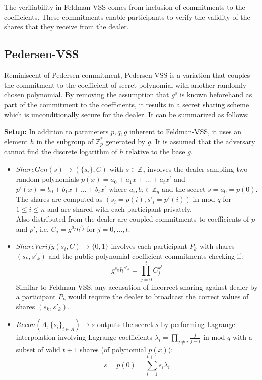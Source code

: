 \documentclass[letterpaper,twocolumn,10pt]{article}
\theoremstyle{definition}
\theoremstyle{remark}
\begin{document}
The verifiability in Feldman-VSS comes from inclusion of commitments to the coefficients. These commitments enable participants to verify the validity of the shares that they receive from the dealer.

\subsection{Pedersen-VSS}
\label{appendix:pedersenVSS}
Reminiscent of Pedersen commitment, Pedersen-VSS is a variation that couples the commitment to the coefficient of secret polynomial with another randomly chosen polynomial. By removing the assumption that $g^s$ is known beforehand as part of the commitment to the coefficients, it results in a secret sharing scheme which is unconditionally secure for the dealer. It can be summarized as follows:

\textbf{Setup:} In addition to parameters $p,q,g$ inherent to Feldman-VSS, it uses an element $h$ in the subgroup of $\mathbb{Z}^*_p$ generated by $g$. It is assumed that the adversary cannot find the discrete logarithm of $h$ relative to the base $g$.

\begin{itemize}
\item $ShareGen(s) \rightarrow (\{s_i\}, C)$ with $s \in \mathbb{Z}_q$ involves the dealer sampling two random polynomials $p(x) = a_0 + a_1x+ \ldots+a_tx^t$ and $p'(x) = b_0 + b_1x +\ldots+b_tx^t$  where $a_i, b_i \in \mathbb{Z}_q$ and the secret $s = a_0 = p(0)$.\\
The shares are computed as $(s_i = p(i), s'_i = p'(i))$ in mod $q$ for $1 \le i \le n$ and are shared with each participant privately.\\
Also distributed from the dealer are coupled commitments to coefficients of $p$ and $p'$, i.e. $C_j = g^{a_j} h^{b_j}$ for $j = 0, ..., t$.
\item $ShareVerify(s_i, C) \rightarrow \{0, 1\}$ involves each participant $P_k$ with shares $(s_k, s'_k)$ and the public polynomial coefficient commitments checking if:
$$g^{s_k} h^{s'_k} = \prod_{j = 0}^{t} C_j^{k^j}$$
Similar to Feldman-VSS, any accusation of incorrect sharing against dealer by a participant $P_k$ would require the dealer to broadcast the correct values of shares $(s_k, s'_k)$.
\item $Recon(A, \{s_i\}_{i \in A}) \rightarrow s$ outputs the secret $s$ by performing Lagrange interpolation involving Lagrange coefficients $\lambda_i = \prod_{j \neq i} \frac{j}{j - i}$ in mod $q$ with a subset of valid $t+1$ shares (of polynomial $p(x)$):
    $$s = p(0) = \sum_{i = 1}^{t+1} s_i \lambda_i$$
\end{itemize}
\end{document}
